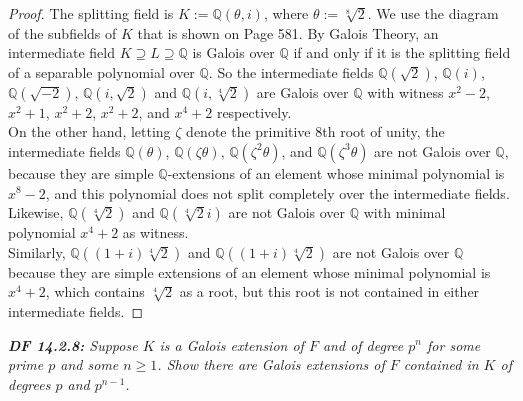 \documentclass{article}
\begin{document}
  \begin{proof}
    The splitting field is $K:=\mathbb{Q}(\theta,i)$, where
    $\theta:=\sqrt[8]{2}$. We use the diagram of the subfields of $K$ that
    is shown on Page 581. By Galois Theory, an intermediate field
    $K\supseteq L\supseteq\mathbb{Q}$ is Galois over $\mathbb{Q}$ if and
    only if it is the splitting field of a separable polynomial over
    $\mathbb{Q}$. So the intermediate fields $\mathbb{Q}(\sqrt{2})$,
    $\mathbb{Q}(i)$, $\mathbb{Q}(\sqrt{-2})$, $\mathbb{Q}(i,\sqrt{2})$ and
    $\mathbb{Q}(i,\sqrt[4]{2})$ are Galois over
    $\mathbb{Q}$ with witness $x^2-2$, $x^2+1$, $x^2+2$, $x^2+2$, and
    $x^4+2$ respectively. \\

    On the other hand, letting $\zeta$ denote the primitive 8th root of
    unity, the intermediate fields $\mathbb{Q}(\theta)$,
    $\mathbb{Q}(\zeta\theta)$, $\mathbb{Q}(\zeta^2\theta)$, and
    $\mathbb{Q}(\zeta^3\theta)$ are not Galois over $\mathbb{Q}$, because
    they are simple $\mathbb{Q}$-extensions of an element whose minimal
    polynomial is $x^8-2$, and this polynomial does not split completely
    over the intermediate fields. Likewise, $\mathbb{Q}(\sqrt[4]{2})$ and
    $\mathbb{Q}(\sqrt[4]{2}i)$ are not Galois over $\mathbb{Q}$ with
    minimal polynomial $x^4+2$ as witness. \\

    Similarly, $\mathbb{Q}((1+i)\sqrt[4]{2})$ and
    $\mathbb{Q}((1+i)\sqrt[4]{2})$ are not Galois over $\mathbb{Q}$ because
    they are simple extensions of an element whose minimal polynomial is
    $x^4+2$, which contains $\sqrt[4]{2}$ as a root, but this root is not
    contained in either intermediate fields.
  \end{proof}

\it \textbf{DF 14.2.8:} Suppose $K$ is a Galois extension of $F$ and of
  degree $p^n$ for some prime $p$ and some $n\geq1$. Show there are Galois
  extensions of $F$ contained in $K$ of degrees $p$ and $p^{n-1}$.
\end{document}
